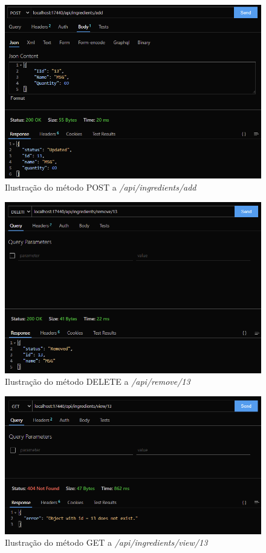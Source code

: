 \begin{figure}[!hbt]
    \centering
    \includegraphics[width=14cm]{Resources/API/Ingredients/Ingredients (1).png}
    \caption{Ilustração do método POST a \textit{/api/ingredients/add}}
    \label{fig:api_ing_1}
\end{figure}
\FloatBarrier
\begin{figure}[!hbt]
    \centering
    \includegraphics[width=14cm]{Resources/API/Ingredients/Ingredients (2).png}
    \caption{Ilustração do método DELETE a \textit{/api/remove/13}}
    \label{fig:api_ing_2}
\end{figure}
\FloatBarrier
\begin{figure}[!hbt]
    \centering
    \includegraphics[width=14cm]{Resources/API/Ingredients/Ingredients (3).png}
    \caption{Ilustração do método GET a \textit{/api/ingredients/view/13}}
    \label{fig:api_ing_3}
\end{figure}

